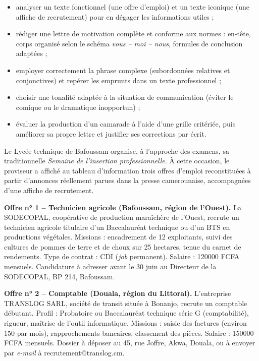 \documentclass[11pt]{article}
\newcommand{\cle}[1]{{\popxbold\color{popdark}#1}}
\newcounter{popsec}
\newcounter{popsub}
\newcommand{\courssub}[1]{%
  \stepcounter{popsub}%
  \par\vspace{9pt}\noindent{\popxbold\fontsize{11.5}{13}\selectfont\color{popink}{\color{poporange}\thepopsec.\thepopsub}\hspace{6pt}#1}\par\nopagebreak\vspace{4pt}
}
\begin{document}
\begin{itemize}
\item analyser un \cle{texte fonctionnel} (une offre d'emploi) et un \cle{texte iconique} (une affiche de recrutement) pour en dégager les informations utiles ;
\item rédiger une \cle{lettre de motivation} complète et conforme aux normes : en-tête, corps organisé selon le schéma \emph{vous -- moi -- nous}, formules de conclusion adaptées ;
\item employer correctement la \cle{phrase complexe} (subordonnées relatives et conjonctives) et repérer les \cle{emprunts} dans un texte professionnel ;
\item choisir une \cle{tonalité} adaptée à la situation de communication (éviter le comique ou le dramatique inopportun) ;
\item évaluer la production d'un camarade à l'aide d'une \cle{grille critériée}, puis améliorer sa propre lettre et justifier ses corrections par écrit.
\end{itemize}

\courssub{Situation}

Le Lycée technique de Bafoussam organise, à l'approche des examens, sa traditionnelle \emph{Semaine de l'insertion professionnelle}. À cette occasion, le proviseur a affiché au tableau d'information trois offres d'emploi reconstituées à partir d'annonces réellement parues dans la presse camerounaise, accompagnées d'une affiche de recrutement.

\textbf{Offre n° 1 -- Technicien agricole (Bafoussam, région de l'Ouest).}
La SODECOPAL, coopérative de production maraîchère de l'Ouest, recrute un technicien agricole titulaire d'un Baccalauréat technique ou d'un BTS en productions végétales. Missions : encadrement de 12 exploitants, suivi des cultures de pommes de terre et de choux sur 25 hectares, tenue du carnet de rendements. Type de contrat : CDI (\emph{job} permanent). Salaire : \num{120000} FCFA mensuels. Candidature à adresser avant le 30 juin au Directeur de la SODECOPAL, BP 214, Bafoussam.

\textbf{Offre n° 2 -- Comptable (Douala, région du Littoral).}
L'entreprise TRANSLOG SARL, société de transit située à Bonanjo, recrute un comptable débutant. Profil : Probatoire ou Baccalauréat technique série G (comptabilité), rigueur, maîtrise de l'outil informatique. Missions : saisie des factures (environ 150 par mois), rapprochements bancaires, classement des pièces. Salaire : \num{150000} FCFA mensuels. Dossier à déposer au 45, rue Joffre, Akwa, Douala, ou à envoyer par \emph{e-mail} à recrutement@translog.cm.
\end{document}
